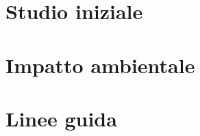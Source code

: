 \documentclass[a4paper,10pt,twoside,openright,reqno,table]{book}
\begin{document}


\frontmatter











\mainmatter

\part{Studio iniziale}

%
%
%
%
\part{Impatto ambientale}
%
%
%
\part{Linee guida}


%
%

\backmatter
\end{document}
